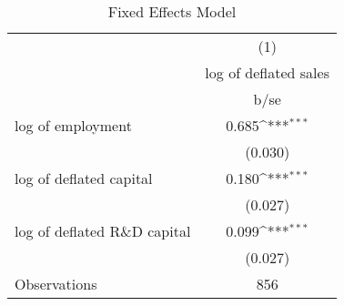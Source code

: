 \begin{table}[htbp]\centering
\def\sym#1{\ifmmode^{#1}\else\(^{#1}\)\fi}
\caption{Fixed Effects Model}
\begin{tabular}{l*{1}{c}}
\toprule
                    &\multicolumn{1}{c}{(1)}\\
                    &\multicolumn{1}{c}{log of deflated sales}\\
                    &        b/se         \\
\midrule
log of employment   &       0.685\sym{***}\\
                    &     (0.030)         \\
log of deflated capital&       0.180\sym{***}\\
                    &     (0.027)         \\
log of deflated R\&D capital&       0.099\sym{***}\\
                    &     (0.027)         \\
\midrule
Observations        &         856         \\
\bottomrule
\end{tabular}
\end{table}
